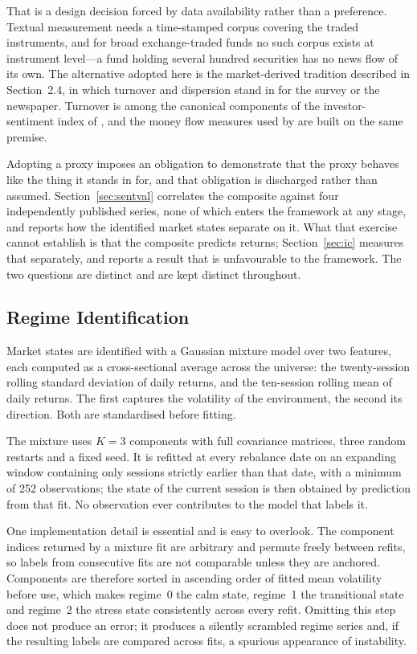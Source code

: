 That is a design decision forced by data availability rather than a preference. Textual
measurement needs a time-stamped corpus covering the traded instruments, and for broad
exchange-traded funds no such corpus exists at instrument level---a fund holding several
hundred securities has no news flow of its own. The alternative adopted here is the
market-derived tradition described in Section~2.4, in which turnover and dispersion
stand in for the survey or the newspaper. Turnover is among the canonical components of
the investor-sentiment index of \citet{bakerwurgler07}, and the money flow measures used
by \citet{singsiri26} are built on the same premise.

Adopting a proxy imposes an obligation to demonstrate that the proxy behaves like the
thing it stands in for, and that obligation is discharged rather than assumed.
Section~\ref{sec:sentval} correlates the composite against four independently published
series, none of which enters the framework at any stage, and reports how the identified
market states separate on it. What that exercise cannot establish is that the composite
predicts returns; Section~\ref{sec:ic} measures that separately, and reports a result
that is unfavourable to the framework. The two questions are distinct and are kept
distinct throughout.

\subsection{Regime Identification}

Market states are identified with a Gaussian mixture model over two features, each
computed as a cross-sectional average across the universe: the twenty-session rolling
standard deviation of daily returns, and the ten-session rolling mean of daily returns.
The first captures the volatility of the environment, the second its direction. Both
are standardised before fitting.

The mixture uses $K = 3$ components with full covariance matrices, three random
restarts and a fixed seed. It is refitted at every rebalance date on an expanding
window containing only sessions strictly earlier than that date, with a minimum of 252
observations; the state of the current session is then obtained by prediction from that
fit. No observation ever contributes to the model that labels it.

One implementation detail is essential and is easy to overlook. The component indices
returned by a mixture fit are arbitrary and permute freely between refits, so labels
from consecutive fits are not comparable unless they are anchored. Components are
therefore sorted in ascending order of fitted mean volatility before use, which makes
regime~0 the calm state, regime~1 the transitional state and regime~2 the stress state
consistently across every refit. Omitting this step does not produce an error; it
produces a silently scrambled regime series and, if the resulting labels are compared
across fits, a spurious appearance of instability.

